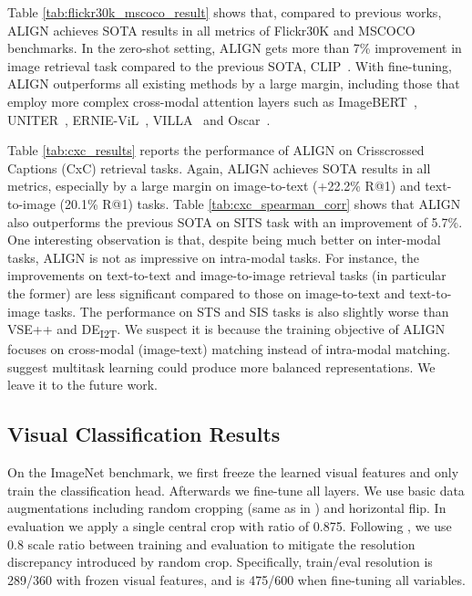 \documentclass{article}
\begin{document}
Table \ref{tab:flickr30k_mscoco_result} shows that, compared to previous works, ALIGN achieves SOTA results in all metrics of Flickr30K and MSCOCO benchmarks. In the zero-shot setting, ALIGN gets more than 7\% improvement in image retrieval task compared to the previous SOTA, CLIP~\cite{radford:clip}. With fine-tuning, ALIGN outperforms all existing methods by a large margin, including those that employ more complex cross-modal attention layers such as ImageBERT~\cite{qi:imagebert}, UNITER~\cite{chen:uniter}, ERNIE-ViL~\cite{yu:ernie-vil}, VILLA~\cite{gan:villa} and Oscar~\cite{li:oscar}.


Table \ref{tab:cxc_results} reports the performance of ALIGN on Crisscrossed Captions (CxC) retrieval tasks. Again, ALIGN achieves  SOTA results in all metrics, especially by a large margin on image-to-text (+22.2\% R@1) and text-to-image (20.1\% R@1) tasks.
Table \ref{tab:cxc_spearman_corr} shows that ALIGN also outperforms the previous SOTA on SITS task with an improvement of 5.7\%.
One interesting observation is that, despite being much better on inter-modal tasks, ALIGN is not as impressive on intra-modal tasks.
For instance, the improvements on text-to-text and image-to-image retrieval tasks (in particular the former) are less significant compared to those on image-to-text and text-to-image tasks.
The performance on STS and SIS tasks is also slightly worse than VSE++ and DE\textsubscript{I2T}. 
We suspect it is because the training objective of ALIGN focuses on cross-modal (image-text) matching instead of intra-modal matching.
\citet{parekh:cxc} suggest multitask learning could produce more balanced representations.
We leave it to the future work.

\vspace{-2mm}
\subsection{Visual Classification Results}
On the ImageNet benchmark, we first freeze the learned visual features and only train the classification head. Afterwards we fine-tune all layers. We use basic data augmentations including random cropping (same as in \citet{szegedy:inception}) and horizontal flip. In evaluation we apply a single central crop with ratio of 0.875. Following \citet{touvron:fixres}, we use 0.8 scale ratio between training and evaluation to mitigate the resolution discrepancy introduced by random crop. Specifically, train/eval resolution is 289/360 with frozen visual features, and is 475/600 when fine-tuning all variables.
\end{document}
